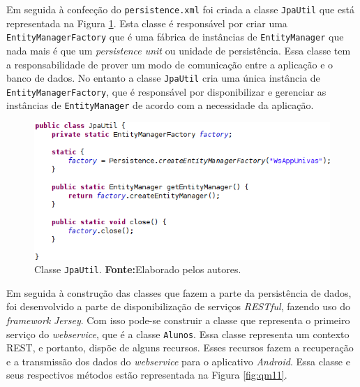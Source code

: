 			\par Em seguida à confecção do \texttt{persistence.xml} foi criada a
		classe \texttt{JpaUtil} que está representada na Figura \ref{fig:qm10}.
		Esta classe é responsável por criar uma \texttt{EntityManagerFactory} que é
		uma  fábrica de instâncias de \texttt{EntityManager} que nada mais é que um
		\textit{persistence unit} ou unidade de persistência. Essa classe tem a
		responsabilidade de prover um modo de comunicação entre a aplicação e o banco
		de dados. No entanto a classe \texttt{JpaUtil} cria uma única instância de
		\texttt{EntityManagerFactory}, que é responsável por disponibilizar e
		gerenciar as instâncias de \texttt{EntityManager} de acordo com a necessidade
		da aplicação.
		
		\pagebreak
		\begin{figure}[h!]
			\centerline{\includegraphics[scale=0.7]{./imagens/2_q_metodologico/qm10.png}}
			\caption[Classe \texttt{JpaUtil}]{Classe \texttt{JpaUtil}.
			\textbf{Fonte:}Elaborado pelos autores.}
			\label{fig:qm10}
		\end{figure}
		
	\par Em seguida à construção das classes que fazem a parte da persistência de
dados, foi desenvolvido a parte de disponibilização de serviços
\textit{RESTful}, fazendo uso do \textit{framework} \textit{Jersey}. Com isso
pode-se construir a classe que representa o primeiro serviço do
\textit{webservice}, que é a classe \texttt{Alunos}. Essa classe representa um
contexto REST, e portanto, dispõe de alguns recursos. Esses recursos fazem a
recuperação e a transmissão dos dados do \textit{webservice} para o aplicativo
\textit{Android}. Essa classe e seus respectivos métodos  estão representada na
Figura \ref{fig:qm11}.

